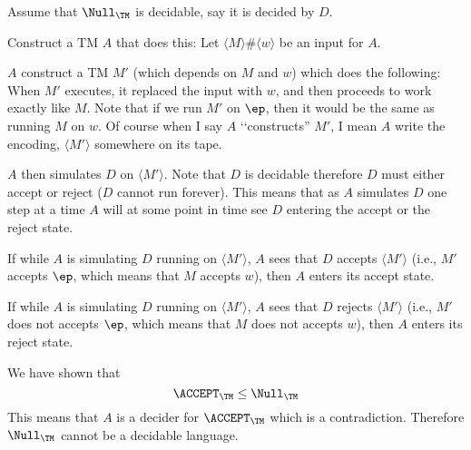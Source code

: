 Assume that $\Null_\TM$ is decidable, say it is decided by $D$.

Construct a TM $A$ that does this:
Let $\langle M \rangle \# \langle w \rangle$ be an input for $A$.
\begin{tightlist}
  \item $A$ construct a TM $M'$ (which depends on $M$ and $w$)
  which does the following:
  When $M'$ executes, it replaced the input with $w$,
  and then proceeds to
  work exactly like $M$.
  Note that if we run $M'$ on $\ep$, then it would be the
  same as running $M$ on $w$.
  Of course when I say $A$ \lq\lq constructs'' $M'$, I  mean $A$ write
  the encoding, $\langle M'\rangle$ somewhere on its tape.
  \item
  $A$ then simulates $D$ on $\langle M' \rangle$.
  Note that $D$ is decidable therefore $D$ must either accept or reject
  ($D$ cannot run forever).
  This means that as $A$ simulates $D$ one step at a time
  $A$ will at some point in time see $D$ entering the
  accept or the reject state.
  \item If while $A$ is simulating $D$ running on $\langle M'\rangle$,
  $A$ sees that $D$ accepts $\langle M' \rangle$ (i.e., 
  $M'$ accepts $\ep$, which means that $M$ accepts $w$), then
  $A$ enters its accept state.
  \item If while $A$ is simulating $D$ running on $\langle M'\rangle$,
  $A$ sees that $D$ rejects $\langle M' \rangle$ (i.e., 
  $M'$ does not accepts $\ep$, which means that $M$ does not
  accepts $w$), then
  $A$ enters its reject state.
  \end{tightlist}
We have shown that
\[
\ACCEPT_\TM \leq \Null_\TM
\]
This means that $A$ is a decider for $\ACCEPT_\TM$ which is a contradiction.
Therefore $\Null_\TM$ cannot be a decidable language.
